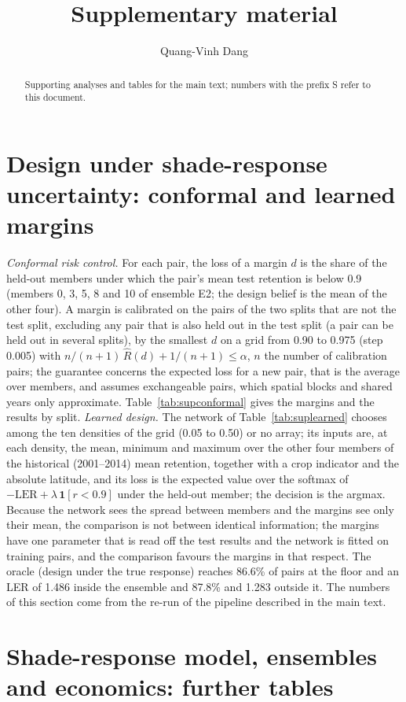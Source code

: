 \documentclass[preprint,12pt,authoryear]{elsarticle}
\begin{document}
\begin{frontmatter}
\title{Supplementary material}
\author{Quang-Vinh Dang}
\address{British University Vietnam, Hung Yen, Vietnam. Supplement to ``Light-sharing control for tracker-based agrivoltaics under a yield floor''.}
\begin{abstract}Supporting analyses and tables for the main text; numbers with the prefix S refer to this document.\end{abstract}
\end{frontmatter}

\renewcommand{\thesection}{S\arabic{section}}
\renewcommand{\thetable}{S\arabic{table}}
\renewcommand{\thefigure}{S\arabic{figure}}



\renewcommand{\appendix}{}


\section{Design under shade-response uncertainty: conformal and learned margins}\label{sec:supp-design}
\emph{Conformal risk control.} For each pair, the loss of a margin $d$ is the share of the held-out members under which the pair's mean test retention is below 0.9 (members 0, 3, 5, 8 and 10 of ensemble E2; the design belief is the mean of the other four). A margin is calibrated on the pairs of the two splits that are not the test split, excluding any pair that is also held out in the test split (a pair can be held out in several splits), by the smallest $d$ on a grid from 0.90 to 0.975 (step 0.005) with $n/(n+1)\,\hat R(d)+1/(n+1)\le\alpha$, $n$ the number of calibration pairs; the guarantee concerns the expected loss for a new pair, that is the average over members, and assumes exchangeable pairs, which spatial blocks and shared years only approximate. Table~\ref{tab:supconformal} gives the margins and the results by split. \emph{Learned design.} The network of Table~\ref{tab:suplearned} chooses among the ten densities of the grid (0.05 to 0.50) or no array; its inputs are, at each density, the mean, minimum and maximum over the other four members of the historical (2001--2014) mean retention, together with a crop indicator and the absolute latitude, and its loss is the expected value over the softmax of $-\mathrm{LER}+\lambda\,\mathbf{1}[r<0.9]$ under the held-out member; the decision is the argmax. Because the network sees the spread between members and the margins see only their mean, the comparison is not between identical information; the margins have one parameter that is read off the test results and the network is fitted on training pairs, and the comparison favours the margins in that respect. The oracle (design under the true response) reaches 86.6\% of pairs at the floor and an LER of 1.486 inside the ensemble and 87.8\% and 1.283 outside it. The numbers of this section come from the re-run of the pipeline described in the main text.



\section{Shade-response model, ensembles and economics: further tables}\label{sup:model}









\end{document}
